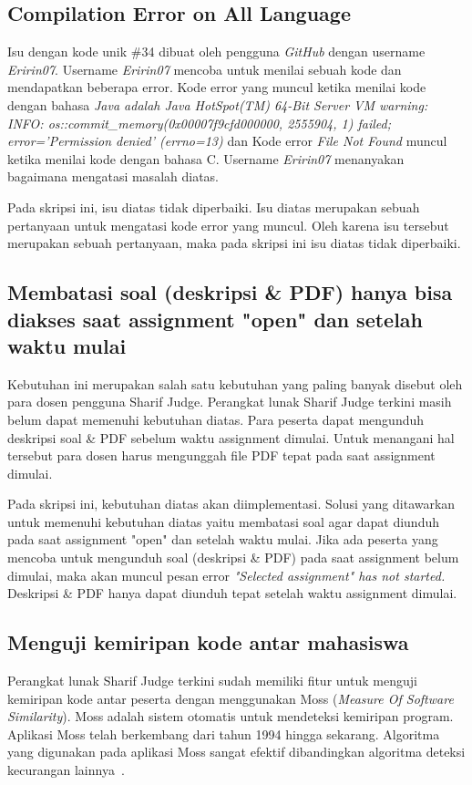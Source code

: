 \subsection{Compilation Error on All Language}
Isu dengan kode unik \#34 dibuat oleh pengguna \textit{GitHub} dengan username \textit{Eririn07}. Username \textit{Eririn07} mencoba untuk menilai sebuah kode dan mendapatkan beberapa error. Kode error yang muncul ketika menilai kode dengan bahasa \textit{Java adalah Java HotSpot(TM) 64-Bit Server VM warning: INFO: os::commit\_memory(0x00007f9cfd000000, 2555904, 1) failed; error='Permission denied' (errno=13)} dan Kode error \textit{File Not Found} muncul ketika menilai kode dengan bahasa C. Username \textit{Eririn07} menanyakan bagaimana mengatasi masalah diatas.

Pada skripsi ini, isu diatas tidak diperbaiki. Isu diatas merupakan sebuah pertanyaan untuk mengatasi kode error yang muncul. Oleh karena isu tersebut merupakan sebuah pertanyaan, maka pada skripsi ini isu diatas tidak diperbaiki.

\subsection{Membatasi soal (deskripsi \& PDF) hanya bisa diakses saat assignment "open" dan setelah waktu mulai}
\label{subsec:membatasisoal}
Kebutuhan ini merupakan salah satu kebutuhan yang paling banyak disebut oleh para dosen pengguna Sharif Judge. Perangkat lunak Sharif Judge terkini masih belum dapat memenuhi kebutuhan diatas. Para peserta dapat mengunduh deskripsi soal \& PDF sebelum waktu assignment dimulai. Untuk menangani hal tersebut para dosen harus mengunggah file PDF tepat pada saat assignment dimulai. 

Pada skripsi ini, kebutuhan diatas akan diimplementasi. Solusi yang ditawarkan untuk memenuhi kebutuhan diatas yaitu membatasi soal agar dapat diunduh pada saat assignment "open" dan setelah waktu mulai. Jika ada peserta yang mencoba untuk mengunduh soal (deskripsi \& PDF) pada saat assignment belum dimulai, maka akan muncul pesan error \textit{"Selected \textit{assignment"} has not started.} Deskripsi \& PDF hanya dapat diunduh tepat setelah waktu assignment dimulai.

\subsection{Menguji kemiripan kode antar mahasiswa}
Perangkat lunak Sharif Judge terkini sudah memiliki fitur untuk menguji kemiripan kode antar peserta dengan menggunakan Moss (\textit{Measure Of Software Similarity}). Moss adalah sistem otomatis untuk mendeteksi kemiripan program. Aplikasi Moss telah berkembang dari tahun 1994 hingga sekarang. Algoritma yang digunakan pada aplikasi Moss sangat efektif dibandingkan algoritma deteksi kecurangan lainnya~\cite{aiken:10:moss}. 

